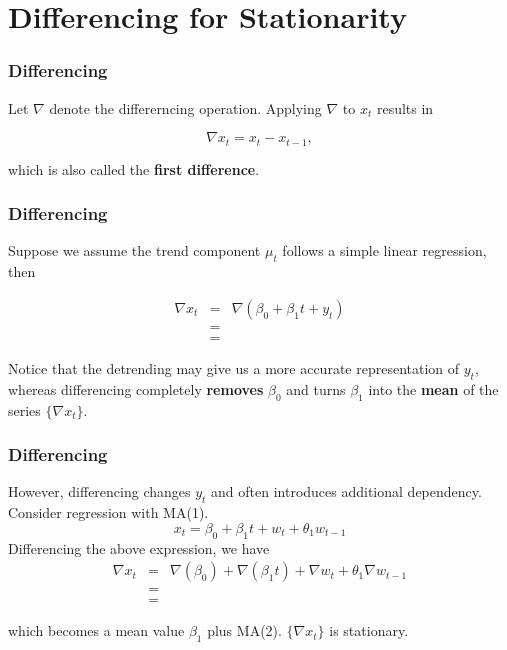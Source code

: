 \documentclass[%
xcolor=pdftex]{beamer}
\begin{document}
\section{Differencing for Stationarity}
\frame{\tableofcontents[currentsection]}




\begin{frame}
\frametitle{Differencing}

Let $\nabla$ denote the differerncing operation. Applying $\nabla$ to $x_t$ results in

\begin{equation} \label{eq:first}
\nabla x_t = x_t-x_{t-1},
\end{equation}

which is also called the \textbf{first difference}.


\end{frame}

\begin{frame}
\frametitle{Differencing}

Suppose we assume the trend component $\mu_t$ follows a simple linear regression, then

\begin{eqnarray*}
\nabla x_t &=& \nabla (\beta_0 + \beta_1 t + y_t) \\
           &=&  \\
           &=&
\end{eqnarray*}

Notice that the detrending may give us a more accurate representation of $y_t$, whereas differencing completely \textbf{removes} $\beta_0$ and turns $\beta_1$ into the \textbf{mean} of the series $\{\nabla x_t \}$.

\end{frame}

\begin{frame}
\frametitle{Differencing}

However, differencing changes $y_t$ and often introduces
additional dependency. Consider regression with MA(1).
$$
x_t=\beta_0+\beta_1 t +w_t+\theta_1 w_{t-1}
$$
Differencing the above expression, we have
\begin{eqnarray*}
\nabla x_t &=& \nabla (\beta_0)  + \nabla(\beta_1 t) + \nabla w_t + \theta_1 \nabla w_{t-1} \\
           &=& \\
           &=&
\end{eqnarray*}

which becomes a mean value $\beta_1$ plus MA(2). $\{\nabla x_t \}$ is stationary.

\end{frame}
\end{document}
